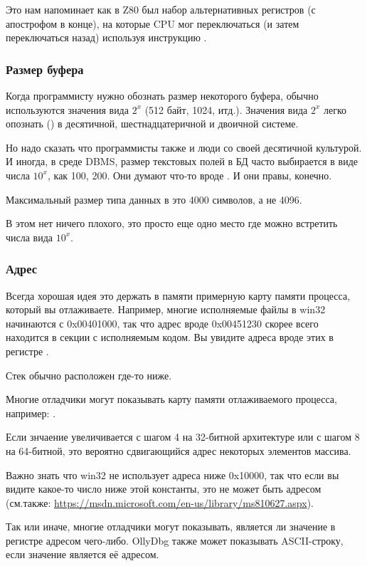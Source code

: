 Это нам напоминает как в Z80 был набор альтернативных регистров (с апострофом в конце), на которые CPU мог переключаться
(и затем переключаться назад) используя инструкцию .

\subsubsection{Размер буфера}

Когда программисту нужно обознать размер некоторого буфера, обычно используются значения вида $2^x$ (512 байт, 1024, итд.).
Значения вида $2^x$ легко опознать () в десятичной, шестнадцатеричной и двоичной системе.

Но надо сказать что программисты также и люди со своей десятичной культурой.
И иногда, в среде \ac{DBMS}, размер текстовых полей в БД часто выбирается в виде числа $10^x$, как 100, 200.
Они думают что-то вроде .
И они правы, конечно.

Максимальный размер типа данных  в \oracle это 4000 символов, а не 4096.

В этом нет ничего плохого, это просто еще одно место где можно встретить числа вида $10^x$.

\subsubsection{Адрес}

Всегда хорошая идея это держать в памяти примерную карту памяти процесса, который вы отлаживаете.
Например, многие исполняемые файлы в win32 начинаются с 0x00401000, так что адрес вроде 0x00451230 скорее всего находится в секции с исполняемым кодом.
Вы увидите адреса вроде этих в регистре .

Стек обычно расположен где-то ниже. %

Многие отладчики могут показывать карту памяти отлаживаемого процесса, например: .

Если знчаение увеличивается с шагом 4 на 32-битной архитектуре или с шагом 8 на 64-битной,
это вероятно сдвигающийся адрес некоторых элементов массива.

Важно знать что win32 не использует адреса ниже 0x10000, так что если вы видите какое-то число ниже этой константы,
это не может быть адресом (см.также: \url{https://msdn.microsoft.com/en-us/library/ms810627.aspx}).

Так или иначе, многие отладчики могут показывать, является ли значение в регистре адресом чего-либо.
OllyDbg также может показывать ASCII-строку, если значение является её адресом.

